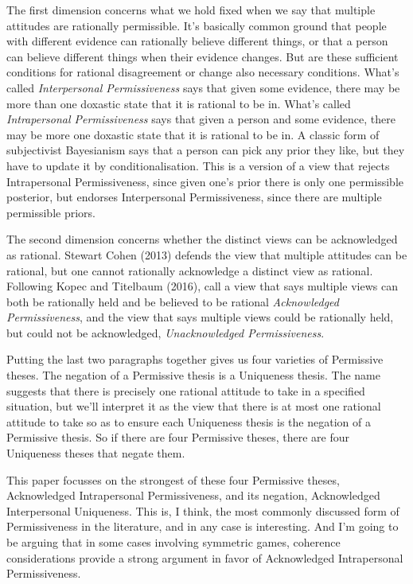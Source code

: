 \documentclass[
  11pt,
]{article}
\begin{document}
The first dimension concerns what we hold fixed when we say that multiple attitudes are rationally permissible. It's basically common ground that people with different evidence can rationally believe different things, or that a person can believe different things when their evidence changes. But are these sufficient conditions for rational disagreement or change also necessary conditions. What's called \emph{Interpersonal Permissiveness} says that given some evidence, there may be more than one doxastic state that it is rational to be in. What's called \emph{Intrapersonal Permissiveness} says that given a person and some evidence, there may be more one doxastic state that it is rational to be in. A classic form of subjectivist Bayesianism says that a person can pick any prior they like, but they have to update it by conditionalisation. This is a version of a view that rejects Intrapersonal Permissiveness, since given one's prior there is only one permissible posterior, but endorses Interpersonal Permissiveness, since there are multiple permissible priors.

The second dimension concerns whether the distinct views can be acknowledged as rational. Stewart Cohen (2013) defends the view that multiple attitudes can be rational, but one cannot rationally acknowledge a distinct view as rational. Following Kopec and Titelbaum (2016), call a view that says multiple views can both be rationally held and be believed to be rational \emph{Acknowledged Permissiveness}, and the view that says multiple views could be rationally held, but could not be acknowledged, \emph{Unacknowledged Permissiveness}.

Putting the last two paragraphs together gives us four varieties of Permissive theses. The negation of a Permissive thesis is a Uniqueness thesis. The name suggests that there is precisely one rational attitude to take in a specified situation, but we'll interpret it as the view that there is at most one rational attitude to take so as to ensure each Uniqueness thesis is the negation of a Permissive thesis. So if there are four Permissive theses, there are four Uniqueness theses that negate them.

This paper focusses on the strongest of these four Permissive theses, Acknowledged Intrapersonal Permissiveness, and its negation, Acknowledged Interpersonal Uniqueness. This is, I think, the most commonly discussed form of Permissiveness in the literature, and in any case is interesting. And I'm going to be arguing that in some cases involving symmetric games, coherence considerations provide a strong argument in favor of Acknowledged Intrapersonal Permissiveness.
\end{document}
